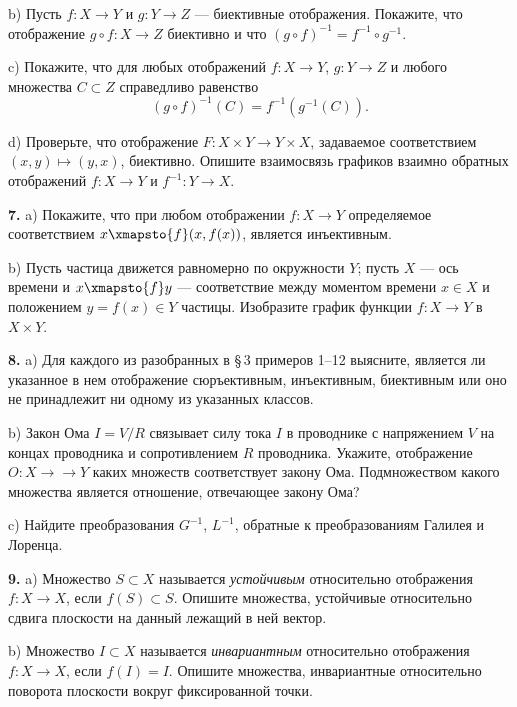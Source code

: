 b) Пусть $f \colon X \to Y$ и $g \colon Y \to Z$ --- биективные отображения. Покажите, что отображение $g \circ f \colon X \to Z$ биективно и что $(g \circ f)^{-1} = f^{-1} \circ g^{-1}$.

c) Покажите, что для любых отображений $f \colon X \to Y$, $g \colon Y \to Z$ и любого множества $C \subset Z$ справедливо равенство
\[
  (g \circ f)^{-1}(C) = f^{-1}(g^{-1}(C)).
\]

d) Проверьте, что отображение $F \colon X \times Y \to Y \times X$, задаваемое соответствием
$(x, y) \mapsto (y, x)$, биективно. Опишите взаимосвязь графиков взаимно обратных отображений $f \colon X \to Y$ и $f^{-1} \colon Y \to X$.

\medskip

\textbf{7.} a) Покажите, что при любом отображении $f \colon X \to Y$ определяемое соответствием $x \xmapsto{f} (x, f(x))$, является инъективным.

b) Пусть частица движется равномерно по окружности $Y$; пусть $X$ --- ось времени и $x \xmapsto{f} y$ --- соответствие между моментом времени $x \in X$ и положением $y = f(x) \in Y$
частицы. Изобразите график функции $f \colon X \to Y$ в $X \times Y$.

\medskip

\textbf{8.} a) Для каждого из разобранных в \S\,3 примеров 1--12 выясните, является ли
указанное в нем отображение сюръективным, инъективным, биективным или оно
не принадлежит ни одному из указанных классов.

b) Закон Ома $I = V / R$ связывает силу тока $I$ в проводнике с напряжением $V$ на
концах проводника и сопротивлением $R$ проводника. Укажите, отображение $O \colon X \to
{} \to Y$ каких множеств соответствует закону Ома. Подмножеством какого множества
является отношение, отвечающее закону Ома?

c) Найдите преобразования $G^{-1}$, $L^{-1}$, обратные к преобразованиям Галилея и Лоренца.

\medskip

\textbf{9.} a) Множество $S \subset X$ называется \textit{устойчивым} относительно отображения
$f \colon X \to X$, если $f(S) \subset S$. Опишите множества, устойчивые относительно сдвига
плоскости на данный лежащий в ней вектор.

b) Множество $I \subset X$ называется \textit{инвариантным} относительно отображения
$f \colon X \to X$, если $f(I) = I$. Опишите множества, инвариантные относительно поворота
плоскости вокруг фиксированной точки.

